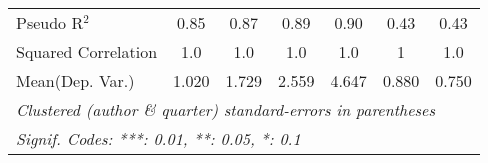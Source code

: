 \begin{tabular}{lcccccc}
   Pseudo R$^2$                                            & 0.85                     & 0.87   & 0.89         & 0.90         & 0.43            & 0.43\\  
   Squared Correlation                                     & 1.0                      & 1.0    & 1.0          & 1.0          & 1               & 1.0\\  
Mean(Dep. Var.) & 1.020 & 1.729 & 2.559 & 4.647 & 0.880 & 0.750 \\
   \midrule \midrule
   \multicolumn{7}{l}{\emph{Clustered (author \& quarter) standard-errors in parentheses}}\\
   \multicolumn{7}{l}{\emph{Signif. Codes: ***: 0.01, **: 0.05, *: 0.1}}\\
\end{tabular}
\par\endgroup
